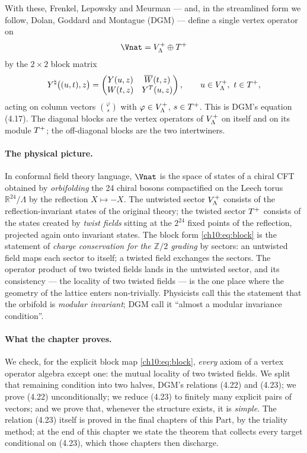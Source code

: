 With these, Frenkel, Lepowsky and Meurman --- and, in the streamlined form we follow,
Dolan, Goddard and Montague (DGM) --- define a single vertex operator on
\begin{equation*}
  \Vnat=\chtenVP\oplus\chtenTP
\end{equation*}
by the $2\times2$ block matrix
\begin{equation}\label{ch10:eq:block}
  Y^\natural\bigl((u,t),z\bigr)=
  \begin{pmatrix} Y(u,z) & \overline{W}(t,z)\\ W(t,z) & Y^T(u,z)\end{pmatrix},
  \qquad u\in V_{\Lambda}^{+},\ t\in T^{+} ,
\end{equation}
acting on column vectors $\binom{\varphi}{s}$ with $\varphi\in V_{\Lambda}^{+}$, $s\in T^{+}$.  This is
DGM's equation (4.17).  The diagonal blocks are the vertex operators of $V_{\Lambda}^{+}$ on itself and
on its module $T^{+}$; the off-diagonal blocks are the two intertwiners.

\paragraph{The physical picture.}
In conformal field theory language, $\Vnat$ is the space of states of a chiral CFT obtained by
\emph{orbifolding} the 24 chiral bosons compactified on the Leech torus $\mathbb R^{24}/\Lambda$
by the reflection $X\mapsto -X$.  The untwisted sector $V_{\Lambda}^{+}$ consists of the
reflection-invariant states of the original theory; the twisted sector $T^{+}$ consists of the
states created by \emph{twist fields} sitting at the $2^{24}$ fixed points of the reflection,
projected again onto invariant states.  The block form \eqref{ch10:eq:block} is the statement of
\emph{charge conservation for the $\mathbb Z/2$ grading} by sectors: an untwisted field maps each
sector to itself; a twisted field exchanges the sectors.  The operator product of two twisted
fields lands in the untwisted sector, and its consistency --- the locality of two twisted fields
--- is the one place where the geometry of the lattice enters non-trivially.  Physicists call this
the statement that the orbifold is \emph{modular invariant}; DGM call it ``almost a modular
invariance condition''.

\paragraph{What the chapter proves.}
We check, for the explicit block map \eqref{ch10:eq:block}, \emph{every} axiom of a vertex
operator algebra except one: the mutual locality of two twisted fields.  We split that remaining
condition into two halves, DGM's relations (4.22) and (4.23); we prove (4.22) unconditionally;
we reduce (4.23) to finitely many explicit pairs of vectors; and we prove that, whenever the
structure exists, it is \emph{simple}.  The relation (4.23) itself is proved in the final
chapters of this Part, by the triality method; at the end of this chapter we state the theorem
that collects every target conditional on (4.23), which those chapters then discharge.

